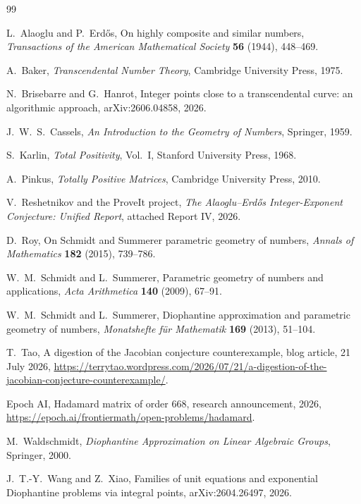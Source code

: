 \documentclass[11pt,oneside]{article}
\theoremstyle{definition}
\theoremstyle{remark}
\begin{document}
\begin{thebibliography}{99}

L.~Alaoglu and P.~Erd\H{o}s,
\newblock On highly composite and similar numbers,
\newblock \emph{Transactions of the American Mathematical Society} \textbf{56} (1944),
448--469.

A.~Baker,
\newblock \emph{Transcendental Number Theory},
\newblock Cambridge University Press, 1975.

N.~Brisebarre and G.~Hanrot,
\newblock Integer points close to a transcendental curve: an algorithmic approach,
\newblock arXiv:2606.04858, 2026.

J.~W.~S.~Cassels,
\newblock \emph{An Introduction to the Geometry of Numbers},
\newblock Springer, 1959.

S.~Karlin,
\newblock \emph{Total Positivity}, Vol.~I,
\newblock Stanford University Press, 1968.

A.~Pinkus,
\newblock \emph{Totally Positive Matrices},
\newblock Cambridge University Press, 2010.

V.~Reshetnikov and the ProveIt project,
\newblock \emph{The Alaoglu--Erd\H{o}s Integer-Exponent Conjecture: Unified Report},
\newblock attached Report IV, 2026.

D.~Roy,
\newblock On Schmidt and Summerer parametric geometry of numbers,
\newblock \emph{Annals of Mathematics} \textbf{182} (2015), 739--786.

W.~M.~Schmidt and L.~Summerer,
\newblock Parametric geometry of numbers and applications,
\newblock \emph{Acta Arithmetica} \textbf{140} (2009), 67--91.

W.~M.~Schmidt and L.~Summerer,
\newblock Diophantine approximation and parametric geometry of numbers,
\newblock \emph{Monatshefte f\"ur Mathematik} \textbf{169} (2013), 51--104.

T.~Tao,
\newblock A digestion of the Jacobian conjecture counterexample,
\newblock blog article, 21 July 2026,
\newblock \url{https://terrytao.wordpress.com/2026/07/21/a-digestion-of-the-jacobian-conjecture-counterexample/}.

Epoch AI,
\newblock Hadamard matrix of order 668,
\newblock research announcement, 2026,
\newblock \url{https://epoch.ai/frontiermath/open-problems/hadamard}.

M.~Waldschmidt,
\newblock \emph{Diophantine Approximation on Linear Algebraic Groups},
\newblock Springer, 2000.

J.~T.-Y.~Wang and Z.~Xiao,
\newblock Families of unit equations and exponential Diophantine problems via integral points,
\newblock arXiv:2604.26497, 2026.

\end{thebibliography}
\end{document}
